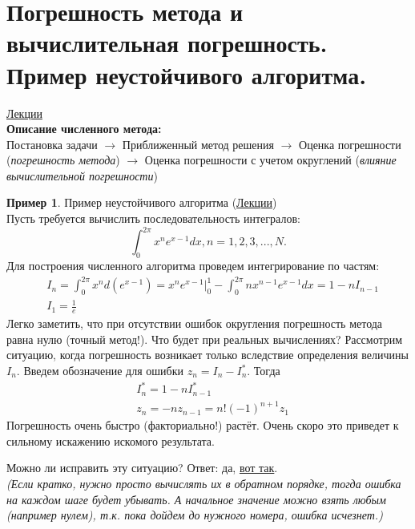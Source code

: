 \documentclass[specialist, subf, href, colorlinks=true, 12pt, times, mtpro, final]{disser}
\theoremstyle{definition}
\newtheorem{example}{Пример}[section]
\begin{document}
\tableofcontents

\section {Погрешность метода и вычислительная погрешность. Пример неустойчивого алгоритма.}
    \hyperlink {lects.1}{Лекции} \\
    \textbf{Описание численного метода:}\\
    Постановка задачи $\rightarrow$ Приближенный метод решения $\rightarrow$ Оценка погрешности (\textit{погрешность метода}) $\rightarrow$ Оценка погрешности с учетом округлений (\textit{влияние вычислительной погрешности})  

    \begin{example}
        Пример неустойчивого алгоритма (\hyperlink {lects.14}{Лекции})\\
        Пусть требуется вычислить последовательность интегралов:
        $$
            \int_0^{2\pi}{x^n e^{x-1}dx}, n = 1,2,3,...,N.
        $$
        Для построения численного алгоритма проведем интегрирование по частям:
        $$
        \begin{aligned}
            & I_n = \int_0^{2\pi}{x^n d(e^{x-1})} = x^n e^{x-1} \big|_0^1 - \int_0^{2\pi}{n x^{n-1} e^{x-1}dx} = 1 - n  I_{n-1} \\
            & I_1 = \frac{1}{e}
        \end{aligned}
        $$
        Легко заметить, что при отсутствии ошибок округления погрешность метода равна нулю (точный метод!). Что будет при реальных вычислениях? Рассмотрим ситуацию, когда погрешность возникает только вследствие определения величины $I_n$. Введем обозначение для ошибки $z_n = I_n - I_n^*$. Тогда
        $$
        \begin{aligned}
            & I_n^* = 1 - n I_{n-1}^* \\
            & z_n = - n z_{n-1} = n! (-1)^{n+1} z_1
        \end{aligned}
        $$
        Погрешность очень быстро (факториально!) растёт. Очень скоро это приведет к сильному искажению искомого результата.
    \end{example}
    \noindent Можно ли исправить эту ситуацию? Ответ: да, \hyperlink {lects.15}{вот так}.\\
    {\it(Если кратко, нужно просто вычислять их в обратном
    порядке, тогда ошибка на каждом шаге будет убывать. А начальное значение можно взять
    любым (например нулем), т.к. пока дойдем до нужного номера, ошибка исчезнет.)}
\end{document}
